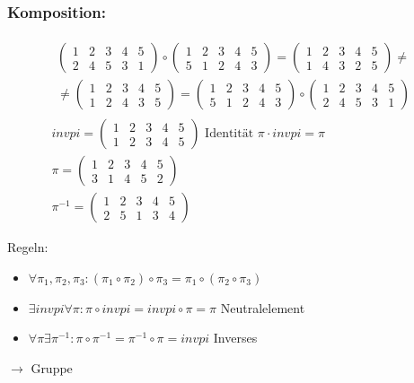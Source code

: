 \subsubsection{Komposition:}
\begin{gather*}
	\begin{split}
		\begin{pmatrix}
			1	&2	&3	&4	&5	\\
			2	&4	&5	&3	&1	
		\end{pmatrix} \circ \begin{pmatrix}
			1	&2	&3	&4	&5	\\
			5	&1	&2	&4	&3
		\end{pmatrix} = \begin{pmatrix}
			1	&2	&3	&4	&5	\\
			1	&4	&3	&2	&5
		\end{pmatrix} \neq \\
		\neq \begin{pmatrix}
			1	&2	&3	&4	&5	\\
			1	&2	&4	&3	&5	
		\end{pmatrix} = \begin{pmatrix}
			1	&2	&3	&4	&5	\\
			5	&1	&2	&4	&3
		\end{pmatrix} \circ \begin{pmatrix}
			1	&2	&3	&4	&5	\\
			2	&4	&5	&3	&1	
		\end{pmatrix}
	\end{split} \\
	invpi = \begin{pmatrix}	
		1	&2	&3	&4	&5	\\
		1	&2	&3	&4	&5
	\end{pmatrix} \text{ Identität } \pi \cdot invpi = \pi \\
	\pi = \begin{pmatrix}
			1	&2	&3	&4	&5	\\
			3	&1	&4	&5	&2	
	\end{pmatrix} \\
	\pi^{-1} = \begin{pmatrix}
			1	&2	&3	&4	&5	\\
			2	&5	&1	&3	&4	
	\end{pmatrix}
\end{gather*}

Regeln:
\begin{itemize}
	\item $\forall \pi_1 , \pi_2 , \pi_3 : ( \pi_1 \circ \pi_2 ) \circ \pi_3 = \pi_1 \circ ( \pi_2 \circ \pi_3 )$
	\item $\exists invpi \forall \pi : \pi \circ invpi = invpi \circ \pi = \pi$ Neutralelement
	\item $\forall \pi \exists \pi^{-1} : \pi \circ \pi^{-1} = \pi^{-1} \circ \pi = invpi$ Inverses
\end{itemize}
$\rightarrow$ Gruppe


